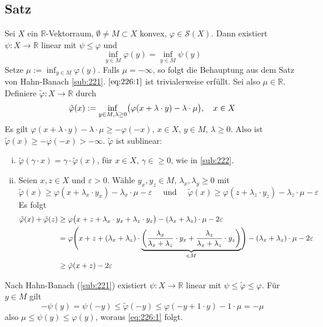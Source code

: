 \subsection{Satz} %
\label{sub:226}
Sei $X$ ein $\mathds{R}$-Vektorraum, $\emptyset \not= M \subset X$ konvex, $\varphi \in \mathcal{S}(X)$. Dann existiert $\psi : X \to \mathds{R}$ linear mit 
$\psi \le \varphi$ und 
\begin{equation*}
	\inf_{y \in M} \varphi(y) = \inf_{y \in M} \psi(y) \label{eq:226:1}\tag{*}
\end{equation*}
Setze $\mu := \inf_{y \in M} \varphi(y)$. Falls $\mu = -\infty$, so folgt die Behauptung aus dem Satz von Hahn-Banach \ref{sub:221}. $\eqref{eq:226:1}$ ist trivialerweise
erfüllt. Sei also $\mu \in \mathds{R}$. Definiere $\tilde{\varphi} : X \to \mathds{R}$ durch
\[
	\tilde{\varphi}(x) := \inf_{y \in M, \lambda  \ge 0} \enbrace[\big]{ \varphi(x+ \lambda \cdot y) - \lambda  \cdot \mu} , \quad x \in X
\]
Es gilt $\varphi(x + \lambda \cdot y)- \lambda \cdot \mu \ge - \varphi(-x)$, $x \in X$, $y\in M$, $\lambda \ge 0$. Also ist $\tilde{\varphi}(x) \ge - \varphi(-x) >-\infty$.
$\tilde{\varphi}$ ist sublinear:
\begin{enumerate}[(i)]
	\item $\tilde{\varphi}(\gamma \cdot x) = \gamma \cdot \tilde{\varphi}(x)$, für $x \in X$, $\gamma \in \ge 0$, wie in \ref{sub:222}.
	\item Seien $x,z \in X$ und $\varepsilon>0$. Wähle $y_x, y_z \in M$, $\lambda_x, \lambda_y \ge 0$ mit
	\[
		\tilde{\varphi}(x) \ge \varphi (x +\lambda_x \cdot y_x) - \lambda_x \cdot \mu -\varepsilon \quad \text{ und }\quad 
		\tilde{\varphi}(x) \ge \varphi (z +\lambda_z \cdot y_z) - \lambda_z \cdot \mu -\varepsilon
	\] 
	Es folgt 
	\begin{align*}
		\tilde{\varphi}(x) + \tilde{\varphi}(z) &\ge \varphi \enbrace[\big]{x+z+ \lambda_x \cdot y_x + \lambda_z \cdot y_z} - (\lambda_x + \lambda_z) \cdot \mu 
		- 2 \varepsilon \\
		&= \varphi \enbrace[\Bigg]{x+z + (\lambda_x+ \lambda_z)\cdot \underbrace{\enbrace*{\frac{\lambda_x}{\lambda_x + \lambda_z} \cdot y_x + \frac{\lambda_z}{\lambda_x + \lambda_z} \cdot y_z }}_{\in M} } - (\lambda_x + \lambda_z) \cdot \mu -2 \varepsilon \\
		&\ge \tilde{\varphi}(x+z) - 2 \varepsilon
	\end{align*}
\end{enumerate}
Nach Hahn-Banach (\ref{sub:221}) existiert $\psi : X \to \mathds{R}$ linear mit $\psi \le \tilde{\varphi} \le \varphi$. Für $y \in M$ gilt 
\[
	-\psi(y) = \psi(-y) \le \tilde{\varphi}(-y) \le \varphi(-y + 1 \cdot y)- 1 \cdot \mu= -\mu
\]
also $\mu \le \psi(y) \le \varphi(y)$, woraus \eqref{eq:226:1} folgt. \bewende

